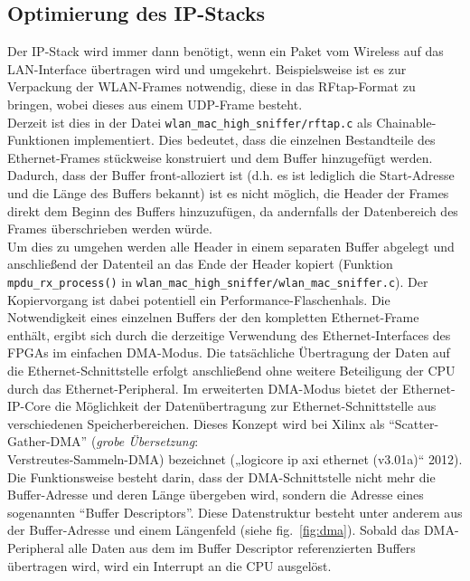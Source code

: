 \documentclass[letterpaper,11pt]{article}
\newcommand{\plusnamesingular}{}
\newcommand{\xrefname}[1]{\protect\renewcommand{\plusnamesingular}{#1}}
\providecommand{\cref}{\plusnamesingular~\ref}
\begin{document}
\begin{onehalfspace}
\subsection{Optimierung des
IP-Stacks}\label{optimierung-des-ip-stacks}

Der IP-Stack wird immer dann benötigt, wenn ein Paket vom Wireless auf
das LAN-Interface übertragen wird und umgekehrt. Beispielsweise ist es
zur Verpackung der WLAN-Frames notwendig, diese in das RFtap-Format zu
bringen, wobei dieses aus einem UDP-Frame besteht.\\ Derzeit ist dies in
der Datei \texttt{wlan\_mac\_high\_sniffer/rftap.c} als
Chainable-Funktionen implementiert. Dies bedeutet, dass die einzelnen
Bestandteile des Ethernet-Frames stückweise konstruiert und dem Buffer
hinzugefügt werden. Dadurch, dass der Buffer front-alloziert ist (d.h.
es ist lediglich die Start-Adresse und die Länge des Buffers bekannt)
ist es nicht möglich, die Header der Frames direkt dem Beginn des
Buffers hinzuzufügen, da andernfalls der Datenbereich des Frames
überschrieben werden würde.\\ Um dies zu umgehen werden alle Header in
einem separaten Buffer abgelegt und anschließend der Datenteil an das
Ende der Header kopiert (Funktion \texttt{mpdu\_rx\_process()} in
\texttt{wlan\_mac\_high\_sniffer/wlan\_mac\_sniffer.c}). Der
Kopiervorgang ist dabei potentiell ein Performance-Flaschenhals. Die
Notwendigkeit eines einzelnen Buffers der den kompletten Ethernet-Frame
enthält, ergibt sich durch die derzeitige Verwendung des
Ethernet-Interfaces des FPGAs im einfachen DMA-Modus. Die tatsächliche
Übertragung der Daten auf die Ethernet-Schnittstelle erfolgt
anschließend ohne weitere Beteiligung der CPU durch das
Ethernet-Peripheral.
Im erweiterten DMA-Modus bietet der Ethernet-IP-Core die Möglichkeit der
Datenübertragung zur Ethernet-Schnittstelle aus verschiedenen
Speicherbereichen. Dieses Konzept wird bei Xilinx als
``Scatter-Gather-DMA'' (\emph{grobe Übersetzung}:\\
Verstreutes-Sammeln-DMA) bezeichnet („logicore ip axi ethernet
(v3.01a)`` 2012). Die Funktionsweise besteht darin, dass der
DMA-Schnittstelle nicht mehr die Buffer-Adresse und deren Länge
übergeben wird, sondern die Adresse eines sogenannten ``Buffer
Descriptors''. Diese Datenstruktur besteht unter anderem aus der
Buffer-Adresse und einem Längenfeld (siehe
\xrefname{fig.}\cref{fig:dma}). Sobald das DMA-Peripheral alle Daten aus
dem im Buffer Descriptor referenzierten Buffers übertragen wird, wird
ein Interrupt an die CPU ausgelöst.


\end{onehalfspace}
\end{document}

